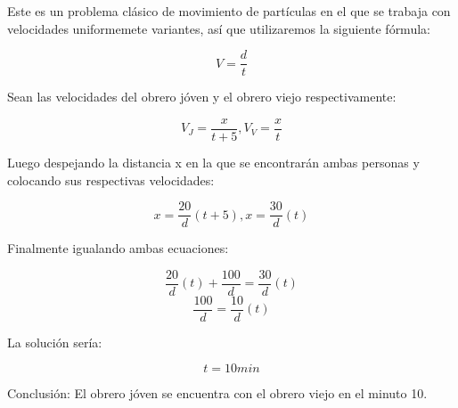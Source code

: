 Este es un problema clásico de movimiento de partículas en el que se trabaja con velocidades uniformemete variantes, así que utilizaremos la siguiente fórmula:

\begin{equation*}
  V = \frac{d}{t}
\end{equation*}

Sean las velocidades del obrero jóven y el obrero viejo respectivamente:

\begin{equation*}
  V_J = \frac{x}{t+5}, V_V = \frac{x}{t}
\end{equation*}

Luego despejando la distancia {x} en la que se encontrarán ambas personas y colocando sus respectivas velocidades:

\begin{equation*}
  x = \frac{20}{d}(t+5), x = \frac{30}{d}(t)
\end{equation*}

Finalmente igualando ambas ecuaciones:

\begin{equation*}
  \frac{20}{d}(t)+\frac{100}{d} = \frac{30}{d}(t)
\end{equation*}
\begin{equation*}
  \frac{100}{d} = \frac{10}{d}(t)
\end{equation*}

La solución sería:

\begin{equation*}
  t = 10 min
\end{equation*}

Conclusión: El obrero jóven se encuentra con el obrero viejo en el minuto 10.